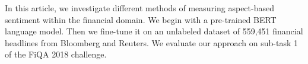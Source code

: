 In this article, we investigate different methods of measuring aspect-based sentiment within the financial domain.
We begin with a pre-trained BERT language model.
Then we fine-tune it on an unlabeled dataset of 559,451 financial headlines from Bloomberg and Reuters.
We evaluate our approach on sub-task 1 of the FiQA 2018 challenge.